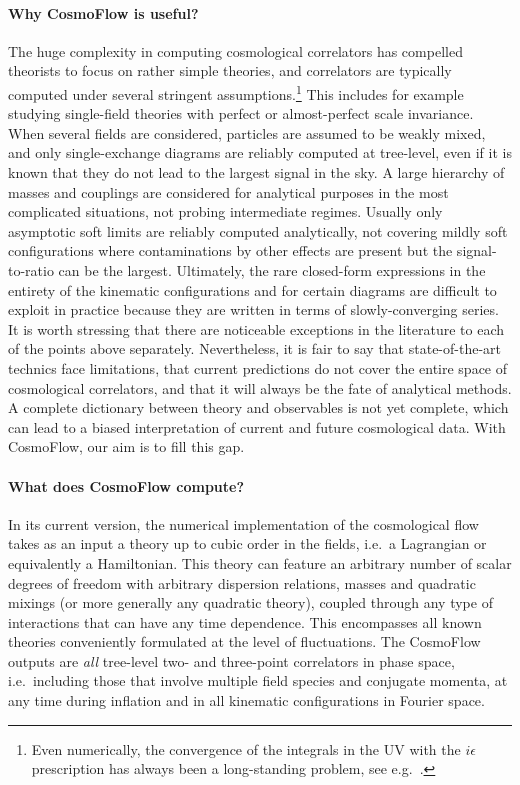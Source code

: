 \documentclass[11pt]{article}
\numberwithin{equation}{section} %
\begin{document}
\paragraph{Why \textsf{CosmoFlow} is useful?} The huge complexity in computing cosmological correlators has compelled theorists to focus on rather simple theories, and correlators are typically computed under several stringent assumptions.\footnote{Even numerically, the convergence of the integrals in the UV with the $i\epsilon$ prescription has always been a long-standing problem, see e.g.~\cite{Chen:2006xjb, Chen:2008wn, Junaid:2015hga, Tran:2022euk}.} This includes for example studying single-field theories with perfect or almost-perfect scale invariance. When several fields are considered, particles are assumed to be weakly mixed, and only single-exchange diagrams are reliably computed at tree-level, even if it is known that they do not lead to the largest signal in the sky. A large hierarchy of masses and couplings are considered for analytical purposes in the most complicated situations, not probing intermediate regimes. Usually only asymptotic soft limits are reliably computed analytically, not covering mildly soft configurations where contaminations by other effects are present but the signal-to-ratio can be the largest. Ultimately, the rare closed-form expressions in the entirety of the kinematic configurations and for certain diagrams are difficult to exploit in practice because they are written in terms of slowly-converging series. It is worth stressing that there are noticeable exceptions in the literature to each of the points above separately. Nevertheless, it is fair to say that state-of-the-art technics face limitations, that current predictions do not cover the entire space of cosmological correlators, and that it will always be the fate of analytical methods. A complete dictionary between theory and observables is not yet complete, which can lead to a biased interpretation of current and future cosmological data. With \textsf{CosmoFlow}, our aim is to fill this gap.


\paragraph{What does \textsf{CosmoFlow} compute?} In its current version, the numerical implementation of the cosmological flow takes as an input a theory up to cubic order in the fields, i.e.~a Lagrangian or equivalently a Hamiltonian. This theory can feature an arbitrary number of scalar degrees of freedom with arbitrary dispersion relations, masses and quadratic mixings (or more generally any quadratic theory), coupled through any type of interactions that can have any time dependence. This encompasses all known theories conveniently formulated at the level of fluctuations. The \textsf{CosmoFlow} outputs are \textit{all} tree-level two- and three-point correlators in phase space, i.e.~including those that involve multiple field species and conjugate momenta, at any time during inflation and in all kinematic configurations in Fourier space. 
\end{document}
